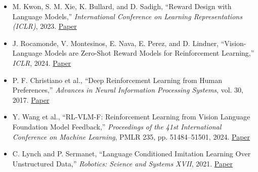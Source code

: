 \documentclass[a4paper]{article}
\begin{document}
\begin{itemize}
  \item M. Kwon, S. M. Xie, K. Bullard, and D. Sadigh, ``Reward Design with
  Language Models,'' \textit{International Conference on Learning
  Representations (ICLR)}, 2023.
  \href{https://openreview.net/forum?id=10uNUgI5Kl}{Paper}
  \item J. Rocamonde, V. Montesinos, E. Nava, E. Perez, and D. Lindner,
  ``Vision-Language Models are Zero-Shot Reward Models for Reinforcement
  Learning,'' \textit{ICLR}, 2024.
  \href{https://proceedings.iclr.cc/paper_files/paper/2024/hash/7a7f6cc5dc2a84fb4edf0feb8e5cfd50-Abstract-Conference.html}{Paper}
  \item P. F. Christiano et al., ``Deep Reinforcement Learning from Human
  Preferences,'' \textit{Advances in Neural Information Processing Systems}, vol. 30,
  2017.
  \href{https://papers.nips.cc/paper/7017-deep-reinforcement-learning}{Paper}
  \item Y. Wang et al., ``RL-VLM-F: Reinforcement Learning from Vision Language
  Foundation Model Feedback,'' \textit{Proceedings of the 41st International
  Conference on Machine Learning}, PMLR 235, pp. 51484--51501, 2024.
  \href{https://proceedings.mlr.press/v235/wang24bn.html}{Paper}
  \item C. Lynch and P. Sermanet, ``Language Conditioned Imitation Learning Over
  Unstructured Data,'' \textit{Robotics: Science and Systems XVII}, 2021.
  \href{https://www.roboticsproceedings.org/rss17/p047.html}{Paper}
\end{itemize}
\end{document}
